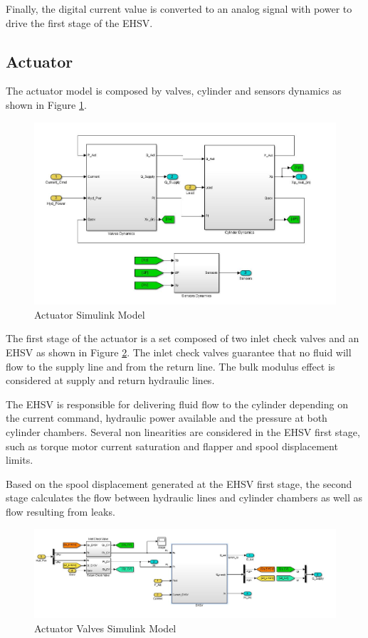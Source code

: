 Finally, the digital current value is converted to an analog signal with power to drive the first stage of the EHSV.

\subsection{Actuator}

The actuator model is composed by valves, cylinder and sensors dynamics as shown in Figure \ref{fig:3_2_Actuator}.

\begin{figure}[H]
	\centering
	\centerline{\includegraphics[width=1.1\textwidth]{Figuras/3.ActuationSystemModel/3-2-Actuator.jpg}}
	\caption{Actuator Simulink Model}
	\label{fig:3_2_Actuator}
\end{figure}

The first stage of the actuator is a set composed of two inlet check valves and an EHSV as shown in Figure \ref{fig:3_2_Valves}. The inlet check valves guarantee that no fluid will flow to the supply line and from the return line. The bulk modulus effect is considered at supply and return hydraulic lines. 

The EHSV is responsible for delivering fluid flow to the cylinder depending on the current command, hydraulic power available and the pressure at both cylinder chambers. Several non linearities are considered in the EHSV first stage, such as torque motor current saturation and flapper and spool displacement limits.

Based on the spool displacement generated at the EHSV first stage, the second stage calculates the flow between hydraulic lines and cylinder chambers as well as flow resulting from leaks. 

\begin{figure}[H]
	\centering
	\centerline{\includegraphics[width=1.1\textwidth]{Figuras/3.ActuationSystemModel/3-2-Valves.jpg}}
	\caption{Actuator Valves Simulink Model}
	\label{fig:3_2_Valves}
\end{figure}

